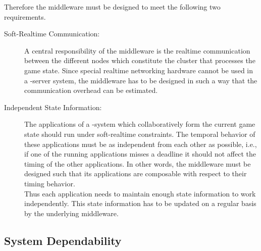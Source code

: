 \documentclass[a4paper, 10pt]{book}
\begin{document}
%
%
Therefore the middleware must be designed to meet the following two
requirements.
\begin{description}
    \item[Soft-Realtime Communication:] A central responsibility of the
        middleware is the realtime communication between the different nodes
        which constitute the cluster that processes the game state. Since
        special realtime networking hardware cannot be used in a
        \MMORG-server system, the middleware has to be designed in such a way that
        the communication overhead can be estimated. %
    \item[Independent State Information:] The applications of a
        \MMORG-system which collaboratively form the current game state
        should run under soft-realtime constraints. The temporal behavior of
        these applications must be as independent from each other as
        possible, i.e., if one of the running applications misses a deadline it
        should not affect the timing of the other applications. In other words,
        the middleware must be designed such that its applications are
        composable with respect to their timing behavior.\\
        Thus each application needs to maintain enough state information to
        work independently. This state information has to be updated on a
        regular basis by the underlying middleware.
\end{description}

%
%


\subsection{System Dependability}
\end{document}
